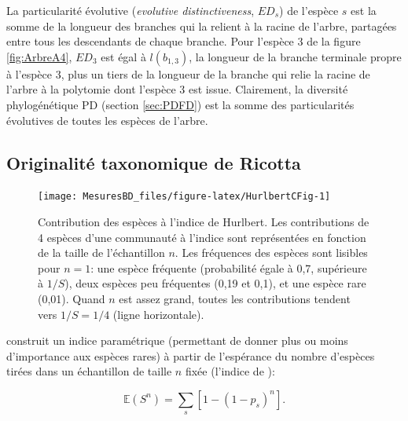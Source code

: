 \documentclass[
  11pt,
  french,
  a4paper,
  extrafontsizes,onecolumn,openright
  ]{memoir}
\begin{document}
\normalsize

La particularité évolutive \autocite{Isaac2007} (\emph{evolutive distinctiveness}, \(\mathit{ED}_s\)) de l'espèce \(s\) est la somme de la longueur des branches qui la relient à la racine de l'arbre, partagées entre tous les descendants de chaque branche.
Pour l'espèce 3 de la figure \ref{fig:ArbreA4}, \(\mathit{ED}_3\) est égal à \(l(b_{1,3})\), la longueur de la branche terminale propre à l'espèce 3, plus un tiers de la longueur de la branche qui relie la racine de l'arbre à la polytomie dont l'espèce 3 est issue.
Clairement, la diversité phylogénétique PD (section \ref{sec:PDFD}) est la somme des particularités évolutives de toutes les espèces de l'arbre.

\hypertarget{sec:OrigTax}{%
\subsection{Originalité taxonomique de Ricotta}\label{sec:OrigTax}}



\scriptsize

\begin{figure}

{\centering \texttt{[image: MesuresBD\_files/figure-latex/HurlbertCFig-1]} 

}

\caption{Contribution des espèces à l'indice de Hurlbert. Les contributions de 4 espèces d'une communauté à l'indice sont représentées en fonction de la taille de l'échantillon \(n\). Les fréquences des espèces sont lisibles pour \(n = 1\): une espèce fréquente (probabilité égale à 0,7, supérieure à \(1/S\)), deux espèces peu fréquentes (0,19 et 0,1), et une espèce rare (0,01). Quand \(n\) est assez grand, toutes les contributions tendent vers \(1/S = 1/4\) (ligne horizontale).}\label{fig:HurlbertCFig}
\end{figure}

\normalsize

\textcite{Ricotta2004a} construit un indice paramétrique (permettant de donner plus ou moins d'importance aux espèces rares) à partir de l'espérance du nombre d'espèces tirées dans un échantillon de taille \(n\) fixée (l'indice de \textcite{Hurlbert1971}):

\begin{equation}
  \label{eq:ESn}
  {\mathbb E}\left( S^n \right)
  = \sum_s{\left[ 1-\left( 1-p_s \right)^n  \right]}.
\end{equation}
\end{document}

